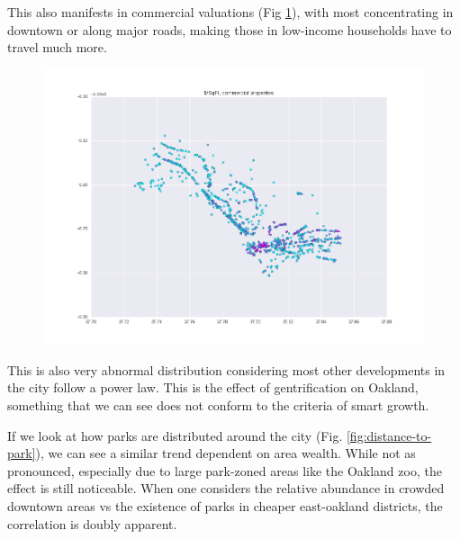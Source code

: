 \documentclass[]{report}
\begin{document}
	 This also manifests in commercial valuations (Fig \ref{fig:cost-per-square-foot-commercial}), with most concentrating in downtown or along major roads, making those in low-income households have to travel much more.
	 
	 \begin{figure}[H]
	 	\centering
	 	\includegraphics[width=\linewidth]{"img/cost per square foot, commercial"}
	 	\caption{}
	 	\label{fig:cost-per-square-foot-commercial}
	 \end{figure}
	 
	 
	 
	 This is also very abnormal distribution considering most other developments in the city follow a power law. This is the effect of gentrification on Oakland, something that we can see does not conform to the criteria of smart growth.
	 
	 If we look at how parks are distributed around the city (Fig. \ref{fig:distance-to-park}), we can see a similar trend dependent on area wealth. While not as pronounced, especially due to large park-zoned areas like the Oakland zoo, the effect is still noticeable. When one considers the relative abundance in crowded downtown areas vs the existence of parks in cheaper east-oakland districts, the correlation is doubly apparent.
	 
\end{document}
